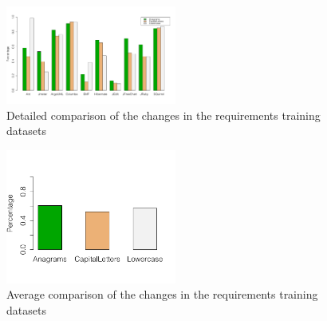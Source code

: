 \clearpage

\begin{figure}[thb!]
  \centering
  \includegraphics[width=0.50\textwidth]{figures/appendix/detailed_comparison_requirement_training_dataset.pdf}
  \vspace{-3mm}
  \caption{Detailed comparison of the changes in the requirements training datasets}
  \label{fig:detailed_comparison_requirement_training_dataset}
\end{figure}

\begin{figure}[thb!]
  \centering
  \includegraphics[width=0.50\textwidth]{figures/appendix/average_comparison_requeriment_training_dataset.pdf}
  \vspace{-3mm}
  \caption{Average comparison of the changes in the requirements training datasets}
  \label{fig:average_comparison_requirement_training_dataset}
\end{figure}


